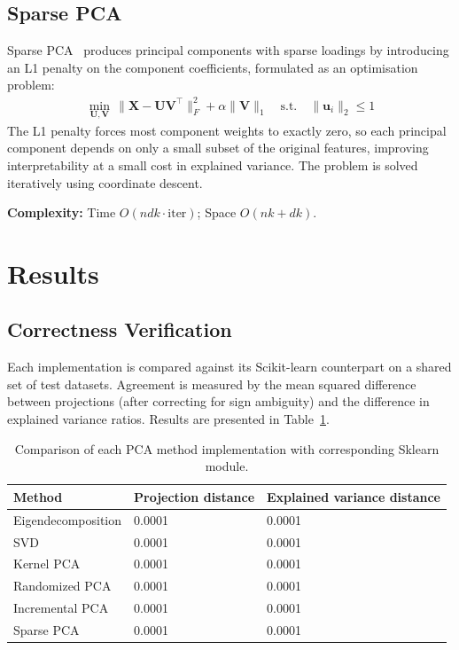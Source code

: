 \subsection{Sparse PCA}

Sparse PCA~\citep{zou2006sparse} produces principal components with sparse
loadings by introducing an L1 penalty on the component coefficients,
formulated as an optimisation problem:
\begin{align}
    \min_{\mathbf{U}, \mathbf{V}} \,
    \|\mathbf{X} - \mathbf{U}\mathbf{V}^\top\|_F^2
    + \alpha \|\mathbf{V}\|_1
    \quad \text{s.t.} \quad \|\mathbf{u}_i\|_2 \leq 1
\end{align}
The L1 penalty forces most component weights to exactly zero, so each
principal component depends on only a small subset of the original features,
improving interpretability at a small cost in explained variance. The problem
is solved iteratively using coordinate descent.

\textbf{Complexity:} Time $O(ndk \cdot \text{iter})$; Space $O(nk + dk)$.

\section{Results}

\subsection{Correctness Verification}

Each implementation is compared against its Scikit-learn counterpart on a shared set of test datasets. Agreement is measured by the mean squared difference between projections (after correcting for sign ambiguity) and the difference in explained variance ratios. Results are presented in Table~\ref{tab:correctness}.

\begin{table}[h]
\centering
\begin{tabular}{lll}
\hline
\textbf{Method} & \textbf{Projection distance} & \textbf{Explained variance distance} \\
\hline
Eigendecomposition & 0.0001 & 0.0001  \\
SVD               & 0.0001  & 0.0001  \\
Kernel PCA        & 0.0001  & 0.0001  \\
Randomized PCA    & 0.0001  & 0.0001  \\
Incremental PCA   & 0.0001  & 0.0001  \\
Sparse PCA        & 0.0001  & 0.0001  \\
\hline
\end{tabular}
\caption{Comparison of each PCA method implementation with corresponding Sklearn module.}
\label{tab:correctness}
\end{table}


